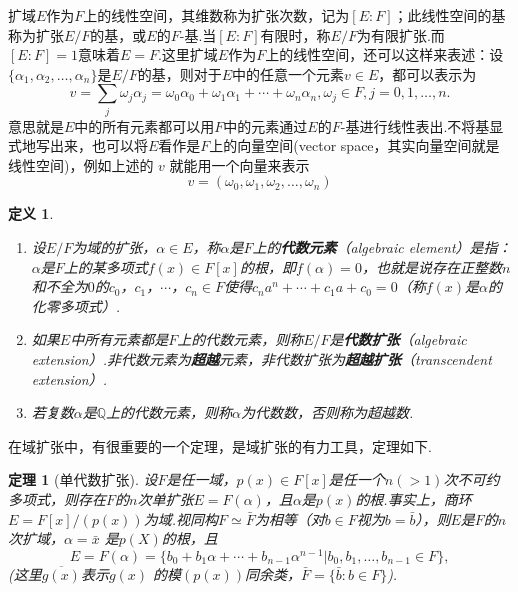 \documentclass[10pt]{ctexart}
\newtheorem{definition}{定义}
\newtheorem{theorem}{定理}
\begin{document}
扩域$E$作为$F$上的线性空间，其维数称为扩张次数，记为$[E:F]$；此线性空间的基称为扩张$E/F$的基，或$E$的$F$-基.当$[E:F]$有限时，称$E/F$为有限扩张.而$[E:F]=1$意味着$E=F$.这里扩域$E$作为$F$上的线性空间，还可以这样来表述：设$\{\alpha_1, \alpha_2, \ldots, \alpha_n \}$是$E/F$的基，则对于$E$中的任意一个元素$v \in E$，都可以表示为
\begin{displaymath}
    v = \sum_{j}\omega_j \alpha_j = \omega_0 \alpha_0 + \omega_1 \alpha_1 + \cdots + \omega_n \alpha_n, \omega_j \in F, j = 0, 1, \ldots, n.
\end{displaymath}
意思就是$E$中的所有元素都可以用$F$中的元素通过$E$的$F$-基进行线性表出.不将基显式地写出来，也可以将$E$看作是$F$上的向量空间(vector space，其实向量空间就是线性空间\cite{vector-space})，例如上述的 $v$ 就能用一个向量来表示
\begin{displaymath}
    v = (\omega_0, \omega_1, \omega_2, \ldots, \omega_n)
\end{displaymath}

\begin{definition}
    \begin{enumerate}[(1)]
        \item 设$E/F$为域的扩张，$\alpha \in E$，称$\alpha$是$F$上的\textbf{代数元素}（algebraic element）是指：$\alpha$是$F$上的某多项式$f(x) \in F[x]$的根，即$f(\alpha) = 0$，也就是说存在正整数$n$和不全为$0$的$c_0$，$c_1$，$\cdots$，$c_n \in F$使得$c_n a^n + \cdots + c_1a + c_0 = 0$（称$f(x)$是$\alpha$的化零多项式）.
        \item 如果$E$中所有元素都是$F$上的代数元素，则称$E/F$是\textbf{代数扩张}（algebraic extension）.非代数元素为\textbf{超越}元素，非代数扩张为\textbf{超越扩张}（transcendent extension）.
        \item 若复数$\alpha$是$\mathbb{Q}$上的代数元素，则称$\alpha$为代数数，否则称为超越数.
    \end{enumerate}
\end{definition}

在域扩张中，有很重要的一个定理，是域扩张的有力工具，定理如下.
\begin{theorem}[单代数扩张]\label{theorem: field extension}
    设$F$是任一域，$p(x) \in F[x]$是任一个$n(>1)$次不可约多项式，则存在$F$的$n$次单扩张$E = F(\alpha)$，且$\alpha$是$p(x)$的根.事实上，商环$E = F[x]/(p(x))$为域.视同构$F \simeq \bar{F}$为相等（对$b \in F$视为$b = \bar{b}$），则$E$是$F$的$n$次扩域，$\alpha = \bar{x}$ 是$p(X)$的根，且
    \begin{displaymath}
        E = F(\alpha) = \{b_0 + b_1 \alpha +  \cdots + b_{n - 1} \alpha^{n - 1} | b_0, b_1, \ldots , b_{n-1} \in F\},
    \end{displaymath}
    (这里$\overline{g(x)}$表示$g(x)$ 的模$(p(x))$同余类，$\bar{F} = \{\bar{b}:b \in F\}$).
\end{theorem}
\end{document}
